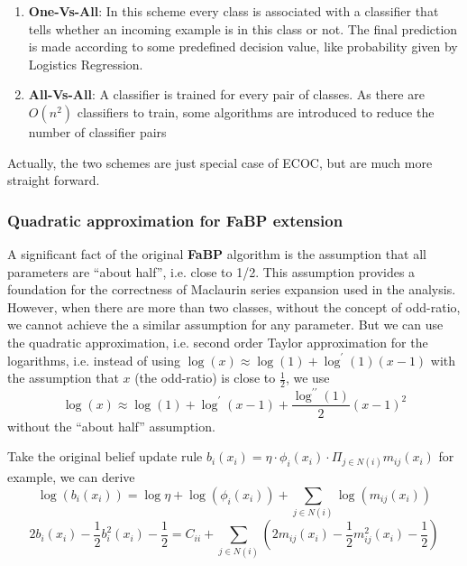 \begin{enumerate}
	\item \textbf{One-Vs-All}: In this scheme every class is associated with a classifier that tells whether an incoming example is in this class or not. The final prediction is made according to some predefined decision value, like probability given by Logistics Regression.
	\item \textbf{All-Vs-All}: A classifier is trained for every pair of classes. As there are $O(n^{2})$ classifiers to train, some algorithms are introduced to reduce the number of classifier pairs\cite{Platt2000}
\end{enumerate}

Actually, the two schemes are just special case of ECOC, but are much more straight forward.

\subsubsection{Quadratic approximation for FaBP extension}
A significant fact of the original \textbf{FaBP} algorithm is the assumption that all parameters are ``about half'', i.e. close to 1/2. This assumption provides a foundation for the correctness of Maclaurin series expansion used in the analysis. However, when there are more than two classes, without the concept of odd-ratio, we cannot achieve the a similar assumption for any parameter. But we can use the quadratic approximation, i.e. second order Taylor approximation for the logarithms, i.e. instead of using $\log(x) \approx \log(1)+\log^{\prime}(1)(x-1)$ with the assumption that $x$ (the odd-ratio) is close to $\frac{1}{2}$, we use
$$\log(x)\approx \log(1)+\log^{\prime}(x-1)+\frac{\log^{\prime\prime}(1)}{2}(x-1)^2$$
without the ``about half'' assumption.

Take the original belief update rule $b_i(x_i) = \eta\cdot \phi_i(x_i)\cdot\Pi_{j\in N(i)}m_{ij}(x_i)$ for example, we can derive
\begin{equation}
\log(b_i(x_i))=\log\eta + \log(\phi_i(x_i))+ \sum_{j\in N(i)}\log(m_{ij}(x_i))
\end{equation}
\begin{equation}
\label{eq:quadratic approx}
2b_i(x_i)-\frac{1}{2}b_i^2(x_i)-\frac{1}{2}=C_{ii}+\sum_{j\in N(i)}(2m_{ij}(x_i)-\frac{1}{2}m_{ij}^2(x_i)-\frac{1}{2})
\end{equation}

